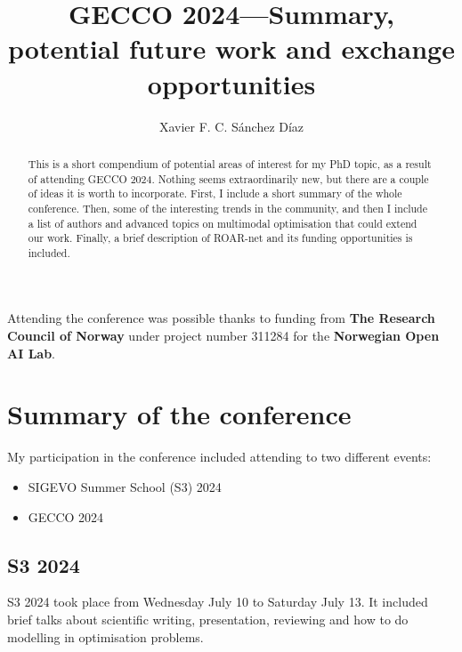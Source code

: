 \documentclass[11pt, letterpaper, oneside]{article}
\title{\textbf{GECCO 2024---Summary,\\potential future work and exchange opportunities}} %
\author{Xavier F. C. Sánchez Díaz} %
\affiliation{Norwegian University of Science and Technology} %
\begin{document}
\maketitle

\begin{abstract}
    This is a short compendium of potential areas of interest for my PhD topic, as a result of attending GECCO 2024.
    Nothing seems extraordinarily new, but there are a couple of ideas it is worth to incorporate.
    First, I include a short summary of the whole conference. Then, some of the interesting trends in the community, and then I include a list of authors and advanced topics on multimodal optimisation that could extend our work.
    Finally, a brief description of ROAR-net and its funding opportunities is included.

\end{abstract}

\vspace{2.5cm}

{\footnotesize
    \noindent
    Attending the conference was possible thanks to funding from \textbf{The Research Council of Norway} under project number 311284 for the \textbf{Norwegian Open AI Lab}.
}

\thispagestyle{firstpage}

\pagebreak


\newgeometry{} %

\section{Summary of the conference}
\label{sec:summary}

My participation in the conference included attending to two different events:

\begin{itemize}
    \item SIGEVO Summer School (S3) 2024
    \item GECCO 2024
\end{itemize}


\subsection{S3 2024}

S3 2024 took place from Wednesday July 10 to Saturday July 13.
It included brief talks about scientific writing, presentation, reviewing and how to do modelling in optimisation problems.
\end{document}
